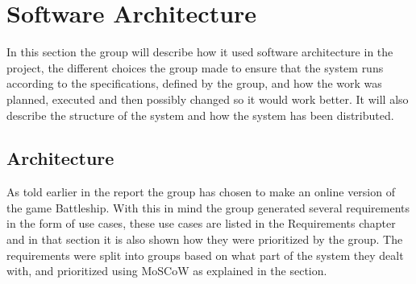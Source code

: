
\section{Software Architecture}
In this section the group will describe how it used software architecture
 in the project, the different choices the group made to ensure that the
  system runs according to the specifications, defined by the group, and
   how the work was planned, executed and then possibly changed so it would
    work better. It will also describe the structure of the system and how
    the system has been distributed.
\\
\subsection{Architecture}
As told earlier in the report the group has chosen to make an online version
of the game Battleship. With this in mind the group generated several
requirements in the form of use cases, these use cases are listed in the
Requirements chapter and in that section it is also shown how they were
prioritized by the group. The requirements were split into groups based
on what part of the system they dealt with, and prioritized using MoSCoW
as explained in the section.
\\
